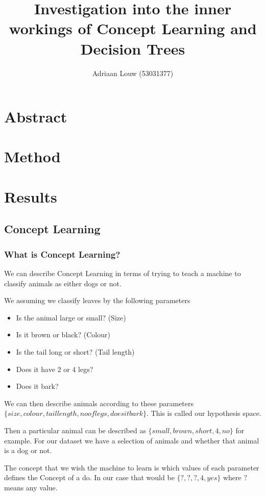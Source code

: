 \documentclass[10pt,a4paper]{article}
\title{Investigation into the inner workings of Concept Learning and Decision Trees}
\author{ Adriaan Louw (53031377)}
\begin{document}
\maketitle

\tableofcontents

\section{Abstract}

\section{Method}

\section{Results}
\subsection{Concept Learning}
\subsubsection{What is Concept Learning?}
We can describe Concept Learning in terms of trying to teach a machine to classify animals as either dogs or not.

We assuming we classify leaves by the following parameters
\begin{itemize}
\item Is the animal large or small? (Size)
\item Is it brown or black? (Colour)
\item Is the tail long or short? (Tail length)
\item Does it have 2 or 4 legs?
\item Does it bark?
\end{itemize}

We can then describe animals according to these parameters
$\{size,colour,tail length,no of legs,does it bark\}$. This is called our hypothesis space.

Then a particular animal can be described as $\{ small, brown, short, 4, no\}$ for example. For our dataset we have a selection of animals and whether that animal is a dog or not.

The concept that we wish the machine to learn is which values of each parameter defines the Concept of a do. In our case that would be $\{?, ?, ?, 4, yes\}$ where $?$ means any value.
\end{document}
